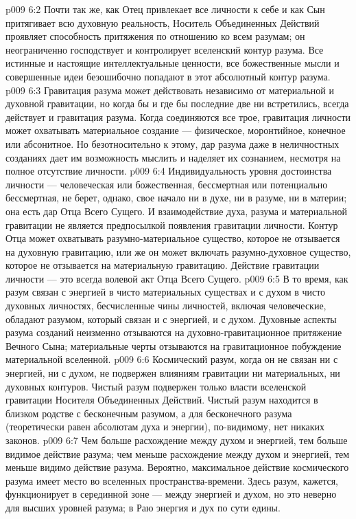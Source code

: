\vs p009 6:2 Почти так же, как Отец привлекает все личности к себе и как Сын притягивает всю духовную реальность, Носитель Объединенных Действий проявляет способность притяжения по отношению ко всем разумам; он неограниченно господствует и контролирует вселенский контур разума. Все истинные и настоящие интеллектуальные ценности, все божественные мысли и совершенные идеи безошибочно попадают в этот абсолютный контур разума.
\vs p009 6:3 \pc Гравитация разума может действовать независимо от материальной и духовной гравитации, но когда бы и где бы последние две ни встретились, всегда действует и гравитация разума. Когда соединяются все трое, гравитация личности может охватывать материальное создание --- физическое, моронтийное, конечное или абсонитное. Но безотносительно к этому, дар разума даже в неличностных созданиях дает им возможность мыслить и наделяет их сознанием, несмотря на полное отсутствие личности.
\vs p009 6:4 \pc Индивидуальность уровня достоинства личности --- человеческая или божественная, бессмертная или потенциально бессмертная, не берет, однако, свое начало ни в духе, ни в разуме, ни в материи; она есть дар Отца Всего Сущего. И взаимодействие духа, разума и материальной гравитации не является предпосылкой появления гравитации личности. Контур Отца может охватывать разумно\hyp{}материальное существо, которое не отзывается на духовную гравитацию, или же он может включать разумно\hyp{}духовное существо, которое не отзывается на материальную гравитацию. Действие гравитации личности --- это всегда волевой акт Отца Всего Сущего.
\vs p009 6:5 В то время, как разум связан с энергией в чисто материальных существах и с духом в чисто духовных личностях, бесчисленные чины личностей, включая человеческие, обладают разумом, который связан и с энергией, и с духом. Духовные аспекты разума созданий неизменно отзываются на духовно\hyp{}гравитационное притяжение Вечного Сына; материальные черты отзываются на гравитационное побуждение материальной вселенной.
\vs p009 6:6 \pc Космический разум, когда он не связан ни с энергией, ни с духом, не подвержен влияниям гравитации ни материальных, ни духовных контуров. Чистый разум подвержен только власти вселенской гравитации Носителя Объединенных Действий. Чистый разум находится в близком родстве с бесконечным разумом, а для бесконечного разума (теоретически равен абсолютам духа и энергии), по\hyp{}видимому, нет никаких законов.
\vs p009 6:7 Чем больше расхождение между духом и энергией, тем больше видимое действие разума; чем меньше расхождение между духом и энергией, тем меньше видимо действие разума. Вероятно, максимальное действие космического разума имеет место во вселенных пространства\hyp{}времени. Здесь разум, кажется, функционирует в серединной зоне --- между энергией и духом, но это неверно для высших уровней разума; в Раю энергия и дух по сути едины.
